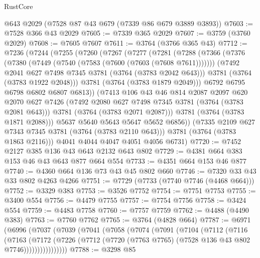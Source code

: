 \begin{lexlean}{RustCore}
\begin{coremodule}
    @643
    @2029
    (@7528 @87 @43 @679 (@7339 @86 @679 @3889 @3893))
@7603 := @7528 @366 @43 @2029
@7605 := @7339 @365 @2029
@7607 := @3759 (@3760 @2029)
@7608 := @7605 @7607
@7611 := @3764 (@3766 @365 @43)
@7712 := @7236
    (@7244
      (@7255
        (@7260
          (@7267
            (@7277
              (@7281
                (@7288
                  (@7366
                    (@7376
                      (@7380 (@7449 (@7540 (@7583 (@7600 (@7603 (@7608 @7611)))))))
                      (@7492 @2041 @627 @7498 @7345 @3781 (@3764 (@3783 @2042 @643)))
                      @3781
                      (@3764 (@3783 @1922 @2048)))
                    @3781
                    (@3764 (@3783 @1879 @2049)))
                  @6792
                  @6795
                  @6798
                  @6802
                  @6807
                  @6813))
              (@7413
                @106
                @43
                @46
                @814
                @2087
                @2097
                @620
                @2070
                @627
                @7426
                (@7492 @2080 @627 @7498 @7345 @3781 (@3764 (@3783 @2081 @643)))
                @3781
                (@3764 (@3783 @2071 @2087)))
              @3781
              (@3764 (@3783 @1871 @2088)))
            @5637
            @5640
            @5643
            @5647
            @5652
            @6856))
        (@7335 @2109 @627 @7343 @7345 @3781 (@3764 (@3783 @2110 @643)))
        @3781
        (@3764 (@3783 @1863 @2116)))
      @4041
      @4044
      @4047
      @4051
      @4056
      @6731)
@7720 := @7452 @2127 @385 @136 @43 @643 @2132 @643 @802
@7729 := @4381 @664 @383 @153 @46 @43 @643 @877 @664 @554
@7733 := @4351 @664 @153 @46 @877
@7740 := @4360 @664 @136 @73 @43 @45 @802 @660
@7746 := @7320 @33 @43 @33 @802 @4263 @4266
@7751 := @7729 (@7733 (@7740 @7746 (@4468 @664)))
@7752 := @3329 @383
@7753 := @3526 @7752
@7754 := @7751 @7753
@7755 := @3400 @554
@7756 := @4479 @7755
@7757 := @7754 @7756
@7758 := @3424 @554
@7759 := @4483 @7758
@7760 := @7757 @7759
@7762 := @4488 (@4490 @383)
@7763 := @7760 @7762
@7765 := @3764 (@4828 @664)
@7787 := @6971
    (@6996
      (@7037
        (@7039
          (@7041
            (@7058
              (@7074
                (@7091
                  (@7104
                    (@7112
                      (@7116
                        (@7163
                          (@7172
                            (@7226
                              (@7712 (@7720 (@7763 @7765) (@7528 @136 @43 @802 @7746))))))))))))))))
@7788 := @3298 @85

\end{coremodule}
\end{lexlean}
